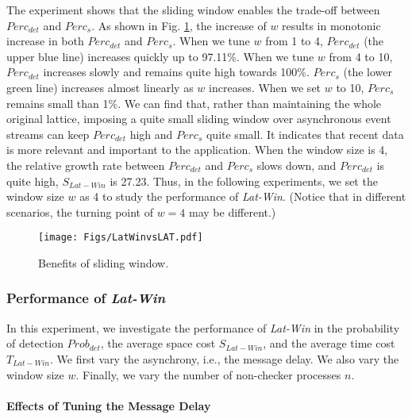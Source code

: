 \documentclass[12pt,journal,letterpaper,compsoc]{IEEEtran}
\begin{document}
The experiment shows that the sliding window enables the trade-off between $Perc_{det}$ and $Perc_{s}$. As shown in Fig. \ref{F:trade-off}, the increase of $w$ results in monotonic increase in both $Perc_{det}$ and $Perc_{s}$. When we tune $w$ from 1 to 4, $Perc_{det}$ (the upper blue line) increases quickly up to 97.11\%. When we tune $w$ from 4 to 10, $Perc_{det}$ increases slowly and remains quite high towards 100\%. $Perc_{s}$ (the lower green line) increases almost linearly as $w$ increases. When we set $w$ to 10, $Perc_{s}$ remains small than 1\%. We can find that, rather than maintaining the whole original lattice, imposing a quite small sliding window over asynchronous event streams can keep $Perc_{det}$ high and $Perc_{s}$ quite small. It indicates that recent data is more relevant and important to the application. When the window size is 4, the relative growth rate between $Perc_{det}$ and $Perc_{s}$ slows down, and $Perc_{det}$ is quite high, $S_{Lat-Win}$ is 27.23.  Thus, in the following experiments, we set the window size $w$ as 4 to study the performance of {\it Lat-Win}. (Notice that in different scenarios, the turning point of $w = 4$ may be different.)

\begin{figure}[htbp]
\begin{center}
  \texttt{[image: Figs/LatWinvsLAT.pdf]}\\
  \centering\parbox[c]{2.5in}{\caption{Benefits of sliding window.}}
  \label{F:trade-off}
\end{center}
\end{figure}

\subsubsection{Performance of {\it Lat-Win}}

In this experiment, we investigate the performance of {\it Lat-Win} in the probability of detection $Prob_{det}$, the average space cost $S_{Lat-Win}$, and the average time cost $T_{Lat-Win}$. We first vary the asynchrony, i.e., the message delay. We also vary the window size $w$. Finally, we vary the number of non-checker processes $n$.

\paragraph{Effects of Tuning the Message Delay}
\end{document}

